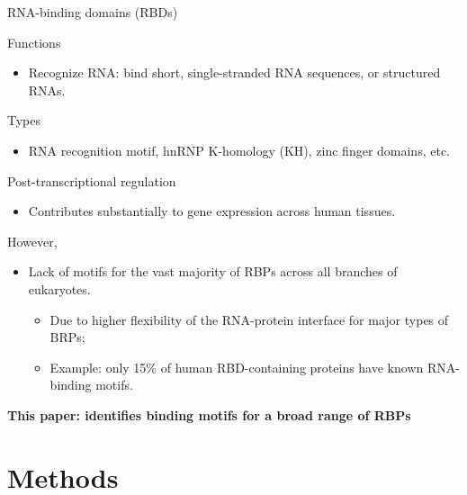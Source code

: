 \documentclass[professionalfont, 12pt, default]{beamer}
\providecommand{\tightlist}{%
    \setlength{\itemsep}{0pt}\setlength{\parskip}{0pt}}
\begin{document}
\begin{frame}{RNA-binding domains (RBDs)}

\begin{block}{Functions}

\begin{itemize}
\tightlist
\item
  Recognize RNA: bind short, single-stranded RNA sequences, or
  structured RNAs.
\end{itemize}

\end{block}

\begin{block}{Types}

\begin{itemize}
\tightlist
\item
  RNA recognition motif, hnRNP K-homology (KH), zinc finger domains,
  etc.
\end{itemize}

\end{block}

\end{frame}

\begin{frame}{Post-transcriptional regulation}

\begin{itemize}
\tightlist
\item
  Contributes substantially to gene expression across human tissues.
\end{itemize}

However,

\begin{itemize}
\tightlist
\item
  Lack of motifs for the vast majority of RBPs across all branches of
  eukaryotes.

  \begin{itemize}
  \tightlist
  \item
    Due to higher flexibility of the RNA-protein interface for major
    types of BRPs;
  \item
    Example: only 15\% of human RBD-containing proteins have known
    RNA-binding motifs.
  \end{itemize}
\end{itemize}

\textbf{This paper: identifies binding motifs for a broad range of RBPs}

\end{frame}

\section{Methods}\label{methods}
\end{document}
